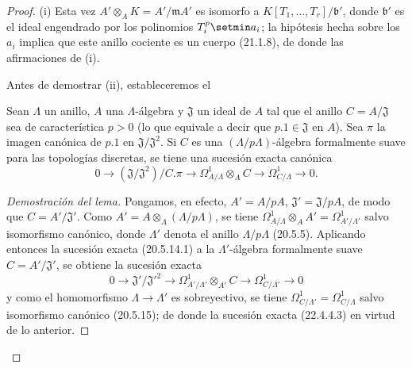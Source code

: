 \begin{proof}
(i) Esta vez $A'\otimes_AK=A'/\mathfrak mA'$ es isomorfo a
$K[T_1,\ldots,T_r]/\mathfrak b'$, donde $\mathfrak b'$ es el ideal engendrado
por los polinomios $T_i^p\setmin a_i$; la hipótesis hecha sobre los $a_i$ implica que
este anillo cociente es un cuerpo (21.1.8), de donde las afirmaciones de (i).

Antes de demostrar (ii), estableceremos el

\begin{lemma}[22.4.4.2]
\label{0.22.4.4.2-fr}
Sean $\Lambda$ un anillo, $A$ una $\Lambda$-álgebra y $\mathfrak J$ un
ideal de $A$ tal que el anillo $C=A/\mathfrak J$ sea de característica
$p>0$ (lo que equivale a decir que $p.1\in\mathfrak J$ en $A$). Sea
$\pi$ la imagen canónica de $p.1$ en
$\mathfrak J/\mathfrak J^2$. Si $C$ es una $(\Lambda/p\Lambda)$-álgebra
formalmente suave para las topologías discretas, se tiene una sucesión exacta
canónica
\begin{equation}
\label{0.22.4.4.3-fr}
  0\longrightarrow(\mathfrak J/\mathfrak J^2)/C.\pi
  \longrightarrow\Omega^1_{A/\Lambda}\otimes_AC
  \longrightarrow\Omega^1_{C/\Lambda}\longrightarrow0.
  \tag{22.4.4.3}
\end{equation}
\end{lemma}

\begin{proof}[Demostración del lema]
Pongamos, en efecto, $A'=A/pA$, $\mathfrak J'=\mathfrak J/pA$, de modo que
$C=A'/\mathfrak J'$. Como
$A'=A\otimes_\Lambda(\Lambda/p\Lambda)$, se tiene
$\Omega^1_{A/\Lambda}\otimes_AA'=\Omega^1_{A'/\Lambda'}$ salvo
isomorfismo canónico, donde $\Lambda'$ denota el anillo
$\Lambda/p\Lambda$ (20.5.5). Aplicando entonces la sucesión exacta (20.5.14.1) a
la $\Lambda'$-álgebra formalmente suave $C=A'/\mathfrak J'$, se obtiene la
sucesión exacta
\[
  0\longrightarrow\mathfrak J'/\mathfrak J'^2
  \longrightarrow\Omega^1_{A'/\Lambda'}\otimes_{A'}C
  \longrightarrow\Omega^1_{C/\Lambda'}\longrightarrow0
\]
y como el homomorfismo $\Lambda\to\Lambda'$ es sobreyectivo, se tiene
$\Omega^1_{C/\Lambda'}=\Omega^1_{C/\Lambda}$ salvo isomorfismo canónico
(20.5.15); de donde la sucesión exacta (22.4.4.3) en virtud de lo anterior.
\end{proof}


\end{proof}
